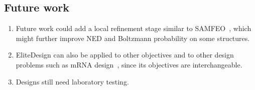 \subsection{Future work}\label{sec:future}
\begin{enumerate}
\item Future work could add a local refinement stage similar to SAMFEO~\citep{zhou2023},
which might further improve NED and Boltzmann probability on some structures.
\item EliteDesign can also be applied to other objectives and to other design problems such as mRNA design~\citep{zhang2023}, since its objectives are interchangeable.
\item Designs still need laboratory testing.
\end{enumerate}
